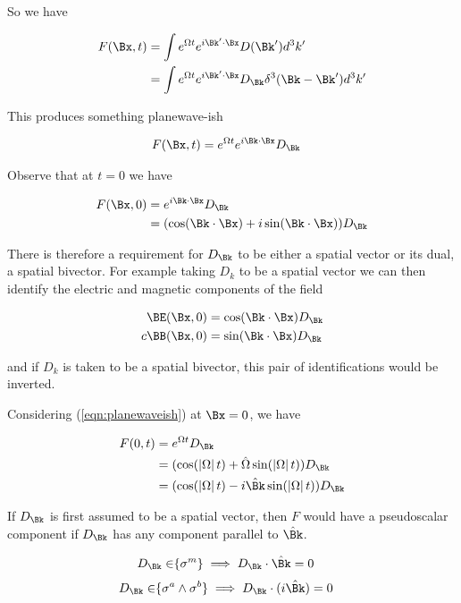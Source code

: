 So we have

\begin{align*}
F(\Bx,t) 
&= \int e^{\Omega t} e^{i \Bk' \cdot \Bx} D(\Bk') d^3 k' \\
&= \int e^{\Omega t} e^{i \Bk' \cdot \Bx} D_\Bk \delta^3(\Bk - \Bk') d^3 k' \\
\end{align*}

This produces something planewave-ish

\begin{align}\label{eqn:planewaveish}
F(\Bx,t) &= e^{\Omega t} e^{i \Bk \cdot \Bx} D_\Bk 
\end{align}

Observe that at $t=0$ we have

\begin{align*}
F(\Bx,0) 
&= e^{i \Bk \cdot \Bx} D_\Bk  \\
&= (\cos (\Bk \cdot \Bx) + i \sin(\Bk \cdot \Bx)) D_\Bk  \\
\end{align*}

There is therefore a requirement for $D_\Bk$ to be either a spatial vector or its dual, a spatial bivector.  For example taking $D_k$ to be a spatial vector we can then identify the electric and magnetic components of the field

\begin{align*}
\BE(\Bx,0) &= \cos (\Bk \cdot \Bx) D_\Bk \\
c \BB(\Bx,0) &= \sin (\Bk \cdot \Bx) D_\Bk
\end{align*}

and if $D_k$ is taken to be a spatial bivector, this pair of identifications would be inverted.

Considering (\ref{eqn:planewaveish}) at $\Bx=0$, we have

\begin{align*}
F(0, t) 
&= e^{\Omega t} D_\Bk \\
&= (\cos(\Abs{\Omega} t) + \hat{\Omega} \sin(\Abs{\Omega} t)) D_\Bk \\
&= (\cos(\Abs{\Omega} t) - i \hat{\Bk} \sin(\Abs{\Omega} t)) D_\Bk \\
\end{align*}

If $D_\Bk$ is first assumed to be a spatial vector, then $F$ would have a pseudoscalar component if $D_\Bk$ has any
component parallel to $\hat{\Bk}$.

\begin{align}\label{eqn:commutationRequirementVector}
D_\Bk \in \span\{\sigma^m\} \implies D_\Bk \cdot \hat{\Bk} = 0 
\end{align}
\begin{align}\label{eqn:commutationRequirementBiVector}
D_\Bk \in \span\{\sigma^a \wedge \sigma^b\} \implies D_\Bk \cdot (i\hat{\Bk}) = 0
\end{align}

